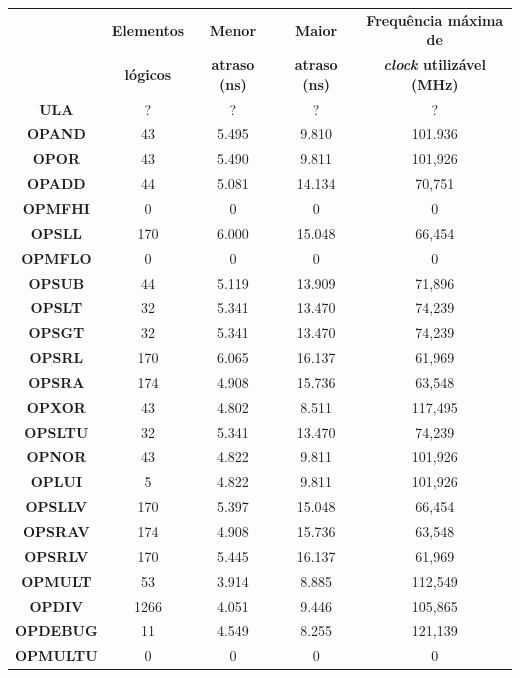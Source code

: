 \documentclass[12pt]{article}
\begin{document}
\begin{table}[H]
	\centering
	\begin{tabular}{|c|c|c|c|c|}
		\hline
		& \textbf{Elementos} & \textbf{Menor} & \textbf{Maior} & \textbf{Frequência máxima de} \\
		& \textbf{lógicos} & \textbf{atraso (ns)} &  \textbf{atraso (ns)} & \textbf{\textit{clock} utilizável (MHz)} \\
		\hline
		\textbf{ULA} & ? & ? & ? & ? \\\hline
		\textbf{OPAND} & 43 & 5.495 & 9.810 & 101.936 \\\hline
		\textbf{OPOR} & 43 & 5.490 & 9.811 & 101,926 \\\hline
		\textbf{OPADD} & 44 & 5.081 & 14.134 & 70,751 \\\hline
		\textbf{OPMFHI} & 0 & 0 & 0 & 0 \\\hline
		\textbf{OPSLL} & 170 & 6.000 & 15.048 & 66,454 \\\hline
		\textbf{OPMFLO} & 0 & 0 & 0 & 0 \\\hline
		\textbf{OPSUB} & 44 & 5.119 & 13.909 & 71,896 \\\hline
		\textbf{OPSLT} & 32 & 5.341 & 13.470 & 74,239 \\\hline
		\textbf{OPSGT} & 32 & 5.341 & 13.470 & 74,239 \\\hline
		\textbf{OPSRL} & 170 & 6.065 & 16.137 & 61,969 \\\hline
		\textbf{OPSRA} & 174 & 4.908 & 15.736 & 63,548 \\\hline
		\textbf{OPXOR} & 43 & 4.802 & 8.511 & 117,495 \\\hline
		\textbf{OPSLTU} & 32 & 5.341 & 13.470 & 74,239 \\\hline
		\textbf{OPNOR} & 43 & 4.822 & 9.811 & 101,926 \\\hline
		\textbf{OPLUI} & 5 & 4.822 & 9.811 & 101,926 \\\hline
		\textbf{OPSLLV} & 170 & 5.397 & 15.048 & 66,454 \\\hline
		\textbf{OPSRAV} & 174 & 4.908 & 15.736 & 63,548 \\\hline
		\textbf{OPSRLV} & 170 & 5.445 & 16.137 & 61,969 \\\hline
		\textbf{OPMULT} & 53 & 3.914 & 8.885 & 112,549 \\\hline
		\textbf{OPDIV} & 1266 & 4.051 & 9.446 & 105,865 \\\hline
		\textbf{OPDEBUG} & 11 & 4.549 & 8.255 & 121,139 \\\hline
		\textbf{OPMULTU} & 0 & 0 & 0 & 0 \\\hline

\end{tabular}
\end{table}
\end{document}
